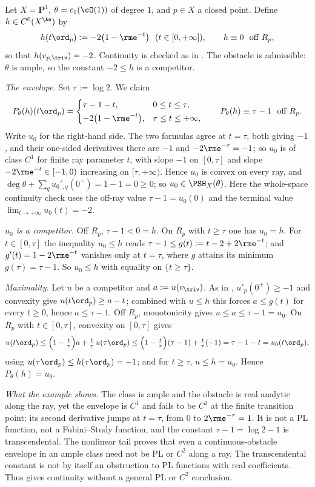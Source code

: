 \begin{example}
\label{ex:ch45-no-regularity}
Let $X=\mathbf P^1$, $\theta=c_1(\cO(1))$ of degree $1$, and
$p\in X$ a closed point.  Define $h\in C^0(X^{\An})$ by
\[
 h(t\ord_p):=-2\bigl(1-\rme^{-t}\bigr)\ \ (t\in[0,+\infty]),
 \qquad
 h\equiv0\ \text{ off } R_p ,
\]
so that $h(v_{p,\triv})=-2$.  Continuity is checked as in
.  The obstacle is admissible: $\theta$ is
ample, so the constant $-2\le h$ is a competitor.

\emph{The envelope.}  Set $\tau:=\log2$.  We claim
\[
 P_\theta(h)(t\ord_p)=
 \begin{cases}
  \tau-1-t, & 0\le t\le\tau,\\[2pt]
  -2\bigl(1-\rme^{-t}\bigr), & \tau\le t\le+\infty,
 \end{cases}
 \qquad
 P_\theta(h)\equiv\tau-1\ \text{ off } R_p .
\]
Write $u_0$ for the right-hand side.  The two formulas agree at
$t=\tau$, both giving $-1$, and their one-sided derivatives there are
$-1$ and $-2\rme^{-\tau}=-1$; so $u_0$ is of class $C^1$ for finite ray parameter $t$, with slope $-1$ on $[0,\tau]$ and slope
$-2\rme^{-t}\in[-1,0)$ increasing on $[\tau,+\infty)$.  Hence $u_0$ is
convex on every ray, and
$\deg\theta+\sum_qu_0'{}_{,q}(0^+)=1-1=0\ge0$; so
$u_0\in\PSH_X(\theta)$.
Here the whole-space continuity check uses the off-ray value
$\tau-1=u_0(0)$ and the terminal value
$\lim_{t\to+\infty}u_0(t)=-2$.

\emph{$u_0$ is a competitor.}  Off $R_p$, $\tau-1<0=h$.  On $R_p$
with $t\ge\tau$ one has $u_0=h$.  For $t\in[0,\tau]$ the inequality
$u_0\le h$ reads $\tau-1\le g(t):=t-2+2\rme^{-t}$; and
$g'(t)=1-2\rme^{-t}$ vanishes only at $t=\tau$, where $g$ attains its
minimum $g(\tau)=\tau-1$.  So $u_0\le h$ with equality on
$\{t\ge\tau\}$.

\emph{Maximality.}  Let $u$ be a competitor and $a:=u(v_{\triv})$.  As
in , $u'_p(0^+)\ge-1$ and convexity give
$u(t\ord_p)\ge a-t$; combined with $u\le h$ this forces
$a\le g(t)$ for every $t\ge0$, hence $a\le\tau-1$.  Off $R_p$,
monotonicity gives $u\le a\le\tau-1=u_0$.  On $R_p$ with
$t\in[0,\tau]$, convexity on $[0,\tau]$ gives
\[
 u(t\ord_p)\le\Bigl(1-\tfrac t\tau\Bigr)a+\tfrac t\tau\,u(\tau\ord_p)
 \le\Bigl(1-\tfrac t\tau\Bigr)(\tau-1)+\tfrac t\tau(-1)
 =\tau-1-t=u_0(t\ord_p),
\]
using $u(\tau\ord_p)\le h(\tau\ord_p)=-1$; and for $t\ge\tau$,
$u\le h=u_0$.  Hence $P_\theta(h)=u_0$.

\emph{What the example shows.}  The class is ample and the obstacle is
real analytic along the ray, yet the envelope is $C^1$ and fails to be $C^2$ at the finite
transition point: its
second derivative jumps at $t=\tau$, from $0$ to $2\rme^{-\tau}=1$.
It is not a PL function, not a Fubini--Study function, and the constant
$\tau-1=\log2-1$ is transcendental.  The nonlinear tail proves that even a continuous-obstacle envelope in
an ample class need not be PL or $C^2$ along a ray.  The transcendental
constant is not by itself an obstruction to PL functions with real
coefficients.  Thus  gives continuity
without a general PL or $C^2$ conclusion.
\end{example}

